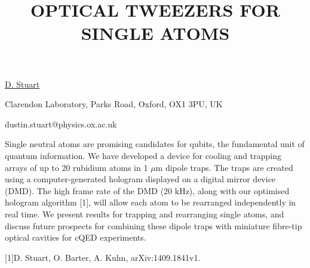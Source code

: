 \title{OPTICAL TWEEZERS FOR SINGLE ATOMS}

\underline{D. Stuart} 

{\normalsize{\vspace{-4mm}
Clarendon Laboratory,
Parks Road,
Oxford,
OX1 3PU,
UK

\email dustin.stuart@physics.ox.ac.uk}}

Single neutral atoms are promising candidates for qubits, the fundamental unit of quantum
information. We have developed a device for cooling and trapping arrays of up to 20 rubidium atoms in
1 $\mu$m dipole traps. The traps are created using a computer-generated hologram displayed on a
digital mirror device (DMD). The high frame rate of the DMD (20 kHz), along with our optimised
hologram algorithm [1], will allow each atom to be rearranged independently in real time. We present
results for trapping and rearranging single atoms, and discuss future prospects for combining these
dipole traps with miniature fibre-tip optical cavities for cQED experiments.

{\normalsize
[1]D. Stuart, O. Barter, A. Kuhn, arXiv:1409.1841v1.
}

\vspace{\baselineskip}
